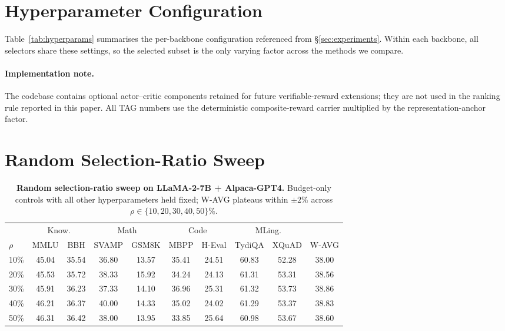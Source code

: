 \vspace{-0.8em}
\section{Hyperparameter Configuration}
\label{app:hyperparams}
Table~\ref{tab:hyperparams} summarises the per-backbone configuration
referenced from \S\ref{sec:experiments}. Within each backbone, all
selectors share these settings, so the selected subset is the only
varying factor across the methods we compare.
\vspace{-0.4em}

\vspace{-0.4em}
\paragraph{Implementation note.}
The codebase contains optional actor--critic components retained for
future verifiable-reward extensions; they are not used in the ranking
rule reported in this paper. All TAG numbers use the deterministic
composite-reward carrier multiplied by the representation-anchor
factor.


\vspace{-0.6em}
\section{Random Selection-Ratio Sweep}
\label{app:ratio-sweep}
\vspace{-0.4em}
\begin{table}[t]
\centering
\caption{\textbf{Random selection-ratio sweep on LLaMA-2-7B +
Alpaca-GPT4.} Budget-only controls with all other hyperparameters
held fixed; W-AVG plateaus within $\pm 2\%$ across
$\rho\in\{10,20,30,40,50\}\%$.}
\label{tab:ratio-sweep}
{\fontsize{7.5pt}{9pt}\selectfont
\setlength{\tabcolsep}{1.8pt}
\renewcommand{\arraystretch}{1.05}
\begin{tabular}{@{}lcccccccc c@{}}
\toprule
& \multicolumn{2}{c}{Know.} & \multicolumn{2}{c}{Math}
& \multicolumn{2}{c}{Code} & \multicolumn{2}{c}{MLing.} & \\
\cmidrule(lr){2-3}\cmidrule(lr){4-5}\cmidrule(lr){6-7}\cmidrule(lr){8-9}
$\rho$ & MMLU & BBH & SVAMP & GSM8K & MBPP & H-Eval & TydiQA & XQuAD & W-AVG \\
\midrule
10\% & 45.04 & 35.54 & 36.80 & 13.57 & 35.41 & 24.51 & 60.83 & 52.28 & 38.00 \\
20\% & 45.53 & 35.72 & 38.33 & 15.92 & 34.24 & 24.13 & 61.31 & 53.31 & 38.56 \\
30\% & 45.91 & 36.23 & 37.33 & 14.10 & 36.96 & 25.31 & 61.32 & 53.73 & 38.86 \\
40\% & 46.21 & 36.37 & 40.00 & 14.33 & 35.02 & 24.02 & 61.29 & 53.37 & 38.83 \\
50\% & 46.31 & 36.42 & 38.00 & 13.95 & 33.85 & 25.64 & 60.98 & 53.67 & 38.60 \\
\bottomrule
\end{tabular}
}
\end{table}


